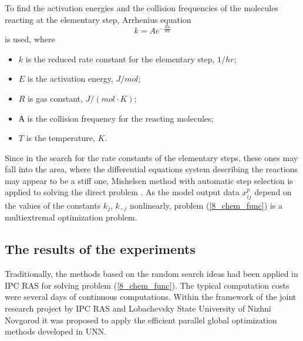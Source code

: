 To find the activation energies and the collision frequencies of the molecules reacting at the elementary step, Arrhenius equation
\[
k=Ae^{-\frac{Ea}{RT}}
\]
is used, where
\begin{itemize}
	\item $k$ is the reduced rate constant for the elementary step, $1/hr$;	
	\item $E$ is the activation energy, $J/{mol}$;
	\item $R$ is gas constant, $J/{(mol \cdot K)}$;
	\item $А$ is the collision frequency for the reacting molecules;
	\item $T$ is the temperature, $K$.	
\end{itemize}

Since in the search for the rate constants of the elementary steps, these ones may fall into the area, where the differential equations system describing the reactions may appear to be a stiff one, Mishelsen method with automatic step selection is applied to solving the direct problem \cite{8_Gubaidullin2010}. As the model output data $x_{ij}^p$ depend on the values of the constants $k_j$, $k_{-j}$ nonlinearly, problem (\ref{8_chem_func}) is a multiextremal optimization problem.

\subsection{The results of the experiments}

Traditionally, the methods based on the random search ideas had been applied in IPC RAS for solving problem (\ref{8_chem_func}). The typical computation costs were several days of continuous computations. Within the framework of the joint research project by IPC RAS and Lobachevsky State University of Nizhni Novgorod it was proposed to apply the efficient parallel global optimization methods developed in UNN. 

